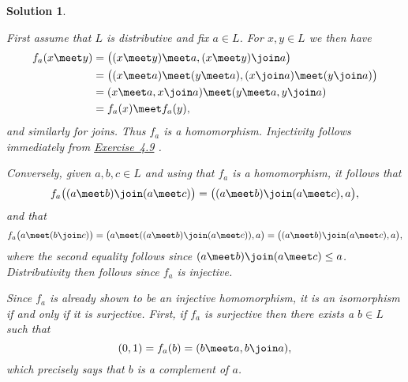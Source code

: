 \documentclass[article, a4paper, 11pt, oneside]{memoir}
\numberwithin{equation}{chapter}
\newcommand{\RNum}[1]{\uppercase\expandafter{\romannumeral #1\relax}}
\newcommand{\exref}[1]{%
    \hyperref[ex:#1]{Exercise~#1}%
}
\theoremstyle{nonumberplain}
\newtheorem{solution}{Solution}
\begin{document}
\begin{solution}
\begin{solutionsec}
    \item First assume that $L$ is distributive and fix $a \in L$. For $x,y \in L$ we then have
    \begin{align*}
        f_a(x \meet y)
            &= \bigl( (x \meet y) \meet a, (x \meet y) \join a \bigr) \\
            &= \bigl( (x \meet a) \meet (y \meet a), (x \join a) \meet (y \join a) \bigr) \\
            &= (x \meet a, x \join a) \meet (y \meet a, y \join a) \\
            &= f_a(x) \meet f_a(y),
    \end{align*}
    and similarly for joins. Thus $f_a$ is a homomorphism. Injectivity follows immediately from \exref{4.9}.

    Conversely, given $a,b,c \in L$ and using that $f_a$ is a homomorphism, it follows that
    \begin{equation*}
        f_a \bigl( (a \meet b) \join (a \meet c) \bigr)
            = \bigl( (a \meet b) \join (a \meet c), a \bigr),
    \end{equation*}
    and that
    \begin{equation*}
        f_a \bigl( a \meet (b \join c) \bigr)
            = \bigl( a \meet ((a \meet b) \join (a \meet c)), a \bigr)
            = \bigl( (a \meet b) \join (a \meet c), a \bigr),
    \end{equation*}
    where the second equality follows since $(a \meet b) \join (a \meet c) \leq a$. Distributivity then follows since $f_a$ is injective.

    \item Since $f_a$ is already shown to be an injective homomorphism, it is an isomorphism if and only if it is surjective. First, if $f_a$ is surjective then there exists a $b \in L$ such that
    \begin{equation*}
        (0,1)
            = f_a(b)
            = (b \meet a, b \join a),
    \end{equation*}
    which precisely says that $b$ is a complement of $a$.


\end{solutionsec}
\end{solution}
\end{document}
